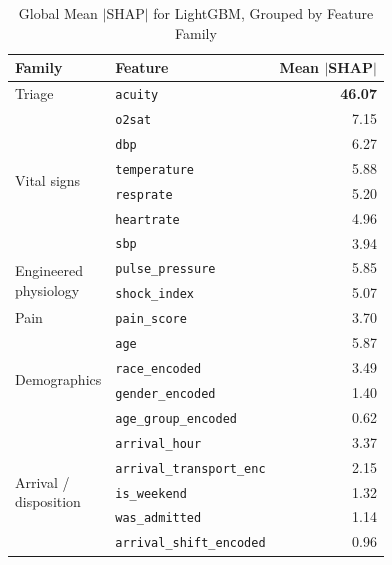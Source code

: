 \documentclass[conference]{IEEEtran}
\begin{document}
\begin{table}[H]
\centering
\caption{Global Mean $|$SHAP$|$ for LightGBM, Grouped by Feature Family}
\label{tab:shap}
\renewcommand{\arraystretch}{1.15}
\begin{tabular}{p{2.0cm}lr}
\toprule
\textbf{Family} & \textbf{Feature} & \textbf{Mean $|$SHAP$|$} \\
\midrule
Triage
 & \texttt{acuity}      & \textbf{46.07} \\
\midrule
\multirow{6}{*}{\parbox{2.0cm}{Vital signs}}
 & \texttt{o2sat}       &  7.15 \\
 & \texttt{dbp}         &  6.27 \\
 & \texttt{temperature} &  5.88 \\
 & \texttt{resprate}    &  5.20 \\
 & \texttt{heartrate}   &  4.96 \\
 & \texttt{sbp}         &  3.94 \\
\midrule
\multirow{2}{*}{\parbox{2.0cm}{Engineered\\physiology}}
 & \texttt{pulse\_pressure} & 5.85 \\
 & \texttt{shock\_index}    & 5.07 \\
\midrule
Pain
 & \texttt{pain\_score} &  3.70 \\
\midrule
\multirow{4}{*}{\parbox{2.0cm}{Demographics}}
 & \texttt{age}                & 5.87 \\
 & \texttt{race\_encoded}      & 3.49 \\
 & \texttt{gender\_encoded}    & 1.40 \\
 & \texttt{age\_group\_encoded}& 0.62 \\
\midrule
\multirow{5}{*}{\parbox{2.0cm}{Arrival /\\disposition}}
 & \texttt{arrival\_hour}             & 3.37 \\
 & \texttt{arrival\_transport\_enc}   & 2.15 \\
 & \texttt{is\_weekend}               & 1.32 \\
 & \texttt{was\_admitted}             & 1.14 \\
 & \texttt{arrival\_shift\_encoded}   & 0.96 \\
\bottomrule
\end{tabular}
\end{table}
\end{document}
